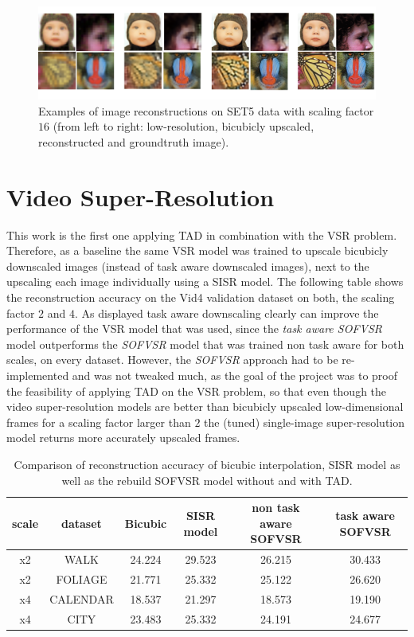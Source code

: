 \begin{figure}[!htbp]
	\centering
	\includegraphics[width=16cm]{figures/examples_sisr_16.png}
	\caption{Examples of image reconstructions on SET5 data with scaling factor $16$ (from left to right: low-resolution, bicubicly upscaled, reconstructed and groundtruth image). }
  \label{fig:examples_sisr_16}
\end{figure}

\section{Video Super-Resolution}
\label{sec:Experiments_VSR}
This work is the first one applying \ac{TAD} in combination with the \ac{VSR} problem. Therefore, as a baseline the same \ac{VSR} model was trained to upscale bicubicly downscaled images (instead of task aware downscaled images), next to the upscaling each image individually using a \ac{SISR} model. The following table shows the reconstruction accuracy on the Vid4 validation dataset on both, the scaling factor $2$ and $4$.
\newline 
As displayed task aware downscaling clearly can improve the performance of the \ac{VSR} model that was used, since the \textit{task aware SOFVSR} model outperforms the \textit{SOFVSR} model that was trained non task aware for both scales, on every dataset. However, the \textit{SOFVSR} approach had to be re-implemented and was not tweaked much, as the goal of the project was to proof the feasibility of applying \ac{TAD} on the \ac{VSR} problem, so that even though the video super-resolution models are better than bicubicly upscaled low-dimensional frames for a scaling factor larger than $2$ the (tuned) single-image super-resolution model returns more accurately upscaled frames. 

\begin{table}[!htbp]
    \begin{center}
    \begin{tabular}{c|c|c|c|c|c}
    scale & dataset & Bicubic & \ac{SISR} model & non task aware SOFVSR
    & task aware SOFVSR \\
    \hline
    x2 & WALK & 24.224 & 29.523 & 26.215  & 30.433 \\
    x2 & FOLIAGE & 21.771 & 25.332 & 25.122 & 26.620 \\
    x4 & CALENDAR & 18.537 & 21.297 & 18.573  & 19.190 \\
    x4 & CITY & 23.483 & 25.332 & 24.191 & 24.677 \\
    \end{tabular}
    \caption{Comparison of reconstruction accuracy of bicubic interpolation, \ac{SISR} model as well as the rebuild SOFVSR model without and with \ac{TAD}.}
    \label{table:vsrperformance}
    \end{center}
\end{table}

